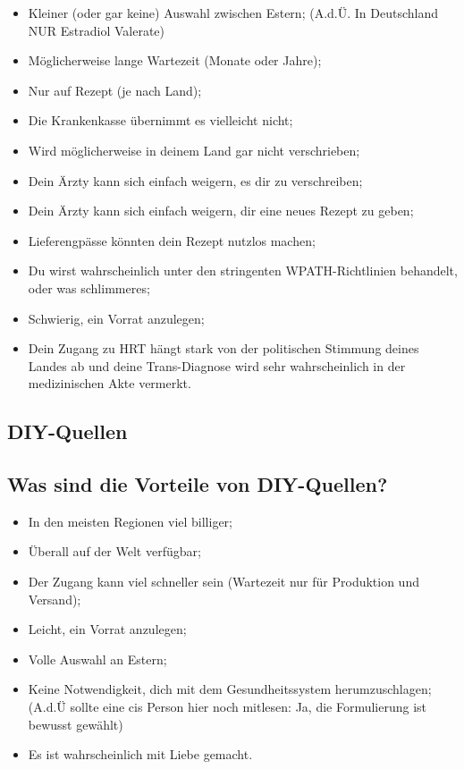 \documentclass{article}
\begin{document}
\begin{itemize}
  \item Kleiner (oder gar keine) Auswahl zwischen Estern; (A.d.Ü. In Deutschland NUR Estradiol Valerate)
  \item Möglicherweise lange Wartezeit (Monate oder Jahre);
  \item Nur auf Rezept (je nach Land);
  \item Die Krankenkasse übernimmt es vielleicht nicht;
  \item Wird möglicherweise in deinem Land gar nicht verschrieben;
  \item Dein Ärzty kann sich einfach weigern, es dir zu verschreiben;
  \item Dein Ärzty kann sich einfach weigern, dir eine neues Rezept zu geben;
  \item Lieferengpässe könnten dein Rezept nutzlos machen;
  \item Du wirst wahrscheinlich unter den stringenten WPATH-Richtlinien behandelt, oder was schlimmeres;
  \item Schwierig, ein Vorrat anzulegen;
  \item Dein Zugang zu HRT hängt stark von der politischen Stimmung deines Landes ab und deine Trans-Diagnose wird sehr wahrscheinlich in der medizinischen Akte vermerkt.
\end{itemize}

\subsection*{DIY-Quellen}

\subsection{Was sind die Vorteile von DIY-Quellen?}

\begin{itemize}
\item In den meisten Regionen viel billiger;
\item Überall auf der Welt verfügbar;
\item Der Zugang kann viel schneller sein (Wartezeit nur für Produktion und Versand);
\item Leicht, ein Vorrat anzulegen;
\item Volle Auswahl an Estern;
\item Keine Notwendigkeit, dich mit dem Gesundheitssystem herumzuschlagen; (A.d.Ü sollte eine cis Person hier noch mitlesen: Ja, die Formulierung ist bewusst gewählt)
\item Es ist wahrscheinlich mit Liebe gemacht.
\end{itemize}
\end{document}
